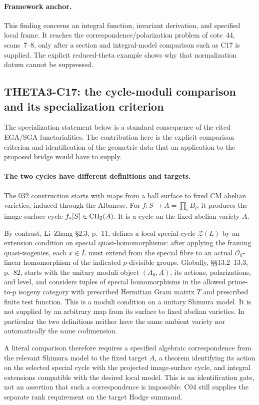 \documentclass[11pt]{article}
\theoremstyle{definition}\newtheorem{definition}[theorem]{Definition}\newtheorem{remark}[theorem]{Remark}
\begin{document}
\paragraph{Framework anchor.}
This finding concerns an integral function, invariant derivation, and
specified local frame.  It reaches the correspondence/polarization
problem of cote~44, scans~7--8, only after a section and integral-model
comparison such as C17 is supplied.  The explicit reduced-theta example
shows why that normalization datum cannot be suppressed.

\subsection{THETA3-C17: the cycle-moduli comparison and its specialization criterion}
\label{C17}

The specialization statement below is a standard consequence of the cited
EGA/SGA functorialities.  The contribution here is the explicit comparison
criterion and identification of the geometric data that an application
to the proposed bridge would have to supply.

\paragraph{The two cycles have different definitions and targets.}
The 032 construction starts with maps from a ball surface to fixed
CM abelian varieties, induced through the Albanese. For
$f:S\to A=\prod_iB_i$, it produces the image-surface cycle
$f_*[S]\in\operatorname{CH}_2(A)$. It is a cycle on the fixed abelian variety
$A$.

By contrast, Li--Zhang \S2.3, p.~11, defines a local special cycle
$\mathcal Z(L)$ by an extension condition on special
quasi-homomorphisms: after applying the framing quasi-isogenies,
each $x\in L$ must extend from the special fibre to an actual
$\mathcal O_k$-linear homomorphism of the indicated
$p$-divisible groups. Globally, \S\S13.2--13.3, p.~82, starts
with the unitary moduli object $(A_0,A)$, its actions,
polarizations, and level, and considers tuples of special
homomorphisms in the allowed prime-to-$p$ isogeny category with
prescribed Hermitian Gram matrix $T$ and prescribed finite test
function. This is a moduli condition on a unitary Shimura model.
It is not supplied by an arbitrary map from its surface to fixed
abelian varieties. In particular the two definitions neither have
the same ambient variety nor automatically the same codimension.

A literal comparison therefore requires a specified algebraic
correspondence from the relevant Shimura model to the fixed target
$A$, a theorem identifying its action on the selected special cycle
with the projected image-surface cycle, and integral extensions
compatible with the desired local model. This is an identification
gate, not an assertion that such a correspondence is impossible.
C04 still supplies the separate rank requirement on the target
Hodge summand.
\end{document}
